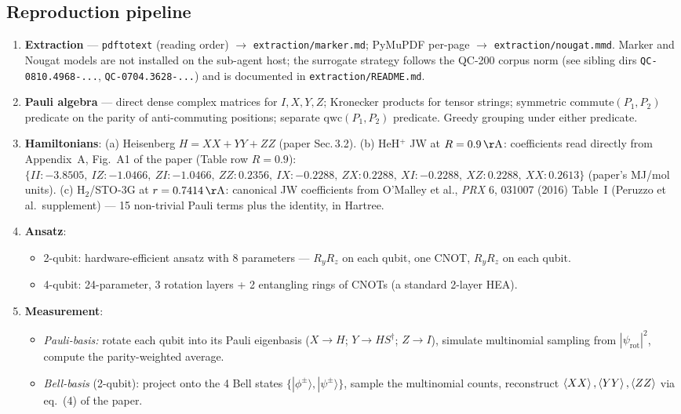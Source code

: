 \documentclass[11pt]{article}
\begin{document}
\subsection{Reproduction pipeline}
\begin{enumerate}
  \item \textbf{Extraction} --- \texttt{pdftotext} (reading order) $\to$ \texttt{extraction/marker.md}; PyMuPDF per-page $\to$ \texttt{extraction/nougat.mmd}. Marker and Nougat models are not installed on the sub-agent host; the surrogate strategy follows the QC-200 corpus norm (see sibling dirs \texttt{QC-0810.4968-...}, \texttt{QC-0704.3628-...}) and is documented in \texttt{extraction/README.md}.
  \item \textbf{Pauli algebra} --- direct dense complex matrices for
    $I,X,Y,Z$; Kronecker products for tensor strings; symmetric $\mathrm{commute}(P_1,P_2)$ predicate on the parity of anti-commuting positions; separate $\mathrm{qwc}(P_1,P_2)$ predicate. Greedy grouping under either predicate.
  \item \textbf{Hamiltonians}:
    (a) Heisenberg $H=XX+YY+ZZ$ (paper Sec.\,3.2).
    (b) HeH$^+$ JW at $R=0.9\,\mathrm{\AA}$: coefficients read directly from
    Appendix~A, Fig.~A1 of the paper (Table row $R=0.9$):
    $\{II\!:{-}3.8505,\ IZ\!:{-}1.0466,\ ZI\!:{-}1.0466,\ ZZ\!:0.2356,\ IX\!:{-}0.2288,\ ZX\!:0.2288,\ XI\!:{-}0.2288,\ XZ\!:0.2288,\ XX\!:0.2613\}$ (paper's MJ/mol units).
    (c) H$_2$/STO-3G at $r=0.7414\,\mathrm{\AA}$: canonical JW coefficients from
    O'Malley et al., \emph{PRX} 6, 031007 (2016) Table~I (Peruzzo et al.\ supplement) --- 15 non-trivial Pauli terms plus the identity, in Hartree.
  \item \textbf{Ansatz}:
    \begin{itemize}
      \item 2-qubit: hardware-efficient ansatz with 8 parameters --- $R_y R_z$ on each qubit, one CNOT, $R_y R_z$ on each qubit.
      \item 4-qubit: 24-parameter, 3 rotation layers + 2 entangling rings of CNOTs (a standard 2-layer HEA).
    \end{itemize}
  \item \textbf{Measurement}:
    \begin{itemize}
      \item \emph{Pauli-basis:} rotate each qubit into its Pauli eigenbasis ($X\to H$; $Y\to HS^\dagger$; $Z\to I$), simulate multinomial sampling from $|\psi_\mathrm{rot}|^2$, compute the parity-weighted average.
      \item \emph{Bell-basis} (2-qubit): project onto the 4 Bell states $\{|\phi^\pm\rangle,|\psi^\pm\rangle\}$, sample the multinomial counts, reconstruct $\braket{XX},\braket{YY},\braket{ZZ}$ via eq.~(4) of the paper.

\end{itemize}
\end{enumerate}
\end{document}
